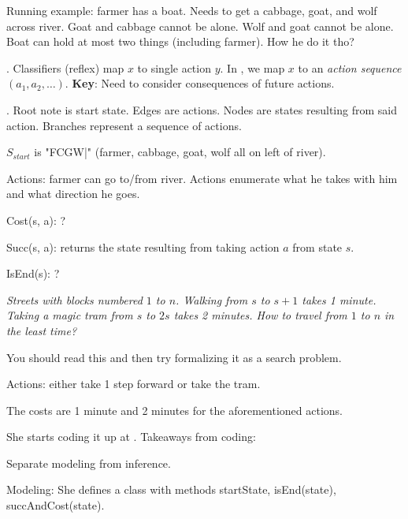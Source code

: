 \documentclass[11pt]{article}
\newcommand\myspace[1][]{\vspace{#1\bigskipamount}\Needspace{10\baselineskip}}
\newcommand\p{\Needspace{10\baselineskip} \noindent}
\begin{document}

Running example: farmer has a boat. Needs to get a cabbage, goat, and wolf across river. Goat and cabbage cannot be alone. Wolf and goat cannot be alone. Boat can hold at most two things (including farmer). How he do it tho?

\p {} . Classifiers (reflex) map $x$ to single action $y$. In , we map $x$ to an \textit{action sequence} $(a_1, a_2, \ldots)$. \textbf{Key}: Need to consider consequences of future actions. 

\myspace
\p {}. Root note is start state. Edges are actions. Nodes are states resulting from said action. Branches represent a sequence of actions. 
\begin{compactitem}
	\item $S_{start}$ is "FCGW|" (farmer, cabbage, goat, wolf all on left of river). 
	\item Actions: farmer can go to/from river. Actions enumerate what he takes with him and what direction he goes. 
	\item Cost(s, a): ?
	\item Succ(s, a): returns the state resulting from taking action $a$ from state $s$. 
	\item IsEnd(s): ?
\end{compactitem}

\begin{example}
	\textit{Streets with blocks numbered $1$ to $n$. Walking from $s$ to $s+1$ takes 1 minute. Taking a magic tram from $s$ to $2s$ takes 2 minutes. How to travel from $1$ to $n$ in the least time?}
	
	\tcblower 
	
	You should read this and then try formalizing it as a search problem.
	\begin{compactitem}
		\item Actions: either take 1 step forward or take the tram.
		\item The costs are 1 minute and 2 minutes for the aforementioned actions.
	\end{compactitem}


	She starts coding it up at . Takeaways from coding:
	\begin{compactitem}
		\item Separate modeling from inference. 
		\item Modeling: She defines a class with methods startState, isEnd(state), succAndCost(state). 
	\end{compactitem}
\end{example}
\end{document}
